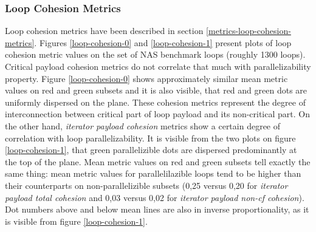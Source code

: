 \subsubsection{Loop Cohesion Metrics}
\label{analysis-loop-cohesion-metrics}
\qquad Loop cohesion metrics have been described in section \ref{metrics-loop-cohesion-metrics}. Figures \ref{loop-cohesion-0} and \ref{loop-cohesion-1} present plots of loop cohesion metric values on the set of NAS benchmark loops (roughly 1300 loops).\newline
\qquad Critical payload cohesion metrics do not correlate that much with parallelizability property. Figure \ref{loop-cohesion-0} shows approximately similar mean metric values on red and green subsets and it is also visible, that red and green dots are uniformly dispersed on the plane. These cohesion metrics represent the degree of interconnection between critical part of loop payload and its non-critical part.\newline
\null\qquad On the other hand, \textit{iterator payload cohesion} metrics show a certain degree of correlation with loop parallelizability. It is visible from the two plots on figure \ref{loop-cohesion-1}, that green parallelizible dots are dispersed predominantly at the top of the plane. Mean metric values on red and green subsets tell exactly the same thing: mean metric values for parallelilazible loops tend to be higher than their counterparts on non-parallelizible subsets (0,25 versus 0,20 for \textit{iterator payload total cohesion} and 0,03 versus 0,02 for \textit{iterator payload non-cf cohesion}). Dot numbers above and below mean lines are also in inverse proportionality, as it is visible from figure \ref{loop-cohesion-1}.   
